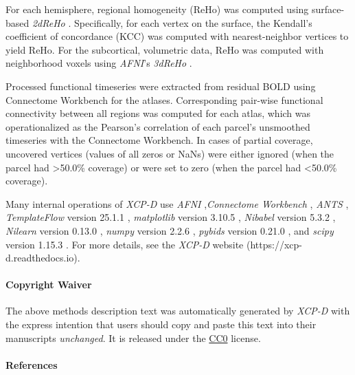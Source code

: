 \documentclass[]{article}
\let\oldparagraph\paragraph
\renewcommand{\paragraph}[1]{\oldparagraph{#1}\mbox{}}
\begin{document}
For each hemisphere, regional homogeneity (ReHo)
\citep{jiang2016regional} was computed using surface-based \emph{2dReHo}
\citep{surface_reho}. Specifically, for each vertex on the surface, the
Kendall's coefficient of concordance (KCC) was computed with
nearest-neighbor vertices to yield ReHo. For the subcortical, volumetric
data, ReHo was computed with neighborhood voxels using \emph{AFNI}'s
\emph{3dReHo} \citep{taylor2013fatcat}.

Processed functional timeseries were extracted from residual BOLD using
Connectome Workbench \citep{marcus2011informatics} for the atlases.
Corresponding pair-wise functional connectivity between all regions was
computed for each atlas, which was operationalized as the Pearson's
correlation of each parcel's unsmoothed timeseries with the Connectome
Workbench. In cases of partial coverage, uncovered vertices (values of
all zeros or NaNs) were either ignored (when the parcel had
\textgreater{}50.0\% coverage) or were set to zero (when the parcel had
\textless{}50.0\% coverage).

Many internal operations of \emph{XCP-D} use \emph{AFNI}
\citep{cox1996afni, cox1997software},\emph{Connectome Workbench}
\citep{marcus2011informatics}, \emph{ANTS} \citep{avants2009advanced},
\emph{TemplateFlow} version 25.1.1 \citep{ciric2022templateflow},
\emph{matplotlib} version 3.10.5 \citep{hunter2007matplotlib},
\emph{Nibabel} version 5.3.2 \citep{brett_matthew_2022_6658382},
\emph{Nilearn} version 0.13.0 \citep{abraham2014machine}, \emph{numpy}
version 2.2.6 \citep{harris2020array}, \emph{pybids} version 0.21.0
\citep{yarkoni2019pybids}, and \emph{scipy} version 1.15.3
\citep{2020SciPy-NMeth}. For more details, see the \emph{XCP-D} website
(https://xcp-d.readthedocs.io).

\hypertarget{copyright-waiver}{%
\paragraph{Copyright Waiver}\label{copyright-waiver}}

The above methods description text was automatically generated by
\emph{XCP-D} with the express intention that users should copy and paste
this text into their manuscripts \emph{unchanged}. It is released under
the \href{https://creativecommons.org/publicdomain/zero/1.0/}{CC0}
license.

\hypertarget{references}{%
\paragraph{References}\label{references}}


\end{document}
